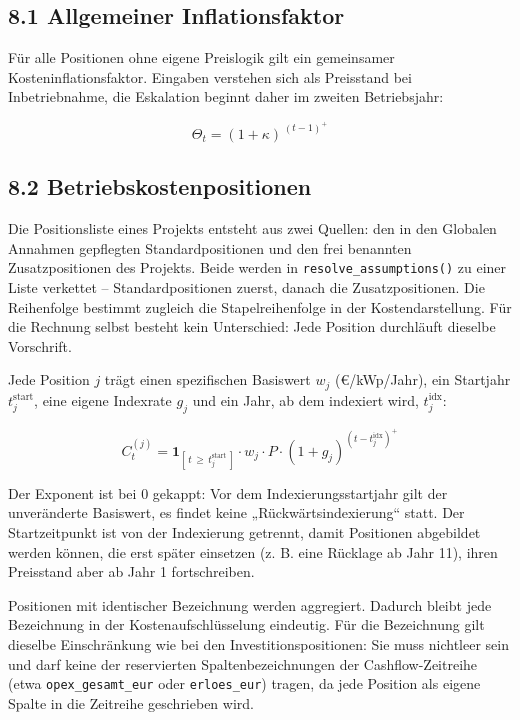 \documentclass[
  a4paper,
  10pt]{article}
\begin{document}
\hypertarget{allgemeiner-inflationsfaktor}{%
\subsection{8.1 Allgemeiner
Inflationsfaktor}\label{allgemeiner-inflationsfaktor}}

Für alle Positionen ohne eigene Preislogik gilt ein gemeinsamer
Kosteninflationsfaktor. Eingaben verstehen sich als Preisstand bei
Inbetriebnahme, die Eskalation beginnt daher im zweiten Betriebsjahr:

\[ \Theta_t = (1 + \kappa)^{\,(t-1)^{+}} \]

\hypertarget{betriebskostenpositionen}{%
\subsection{8.2
Betriebskostenpositionen}\label{betriebskostenpositionen}}

Die Positionsliste eines Projekts entsteht aus zwei Quellen: den in den
Globalen Annahmen gepflegten Standardpositionen und den frei benannten
Zusatzpositionen des Projekts. Beide werden in
\texttt{resolve\_assumptions()} zu einer Liste verkettet --
Standardpositionen zuerst, danach die Zusatzpositionen. Die Reihenfolge
bestimmt zugleich die Stapelreihenfolge in der Kostendarstellung. Für
die Rechnung selbst besteht kein Unterschied: Jede Position durchläuft
dieselbe Vorschrift.

Jede Position \(j\) trägt einen spezifischen Basiswert \(w_j\)
(€/kWp/Jahr), ein Startjahr \(t^{\mathrm{start}}_j\), eine eigene
Indexrate \(g_j\) und ein Jahr, ab dem indexiert wird,
\(t^{\mathrm{idx}}_j\):

\[ C^{(j)}_t = \mathbf{1}_{[\,t\, \geq\, t^{\mathrm{start}}_j\,]} \cdot w_j \cdot P \cdot (1 + g_j)^{\left(t - t^{\mathrm{idx}}_j\right)^{+}} \]

Der Exponent ist bei \(0\) gekappt: Vor dem Indexierungsstartjahr gilt
der unveränderte Basiswert, es findet keine „Rückwärtsindexierung``
statt. Der Startzeitpunkt ist von der Indexierung getrennt, damit
Positionen abgebildet werden können, die erst später einsetzen (z. B.
eine Rücklage ab Jahr 11), ihren Preisstand aber ab Jahr 1
fortschreiben.

Positionen mit identischer Bezeichnung werden aggregiert. Dadurch bleibt
jede Bezeichnung in der Kostenaufschlüsselung eindeutig. Für die
Bezeichnung gilt dieselbe Einschränkung wie bei den
Investitionspositionen: Sie muss nichtleer sein und darf keine der
reservierten Spaltenbezeichnungen der Cashflow-Zeitreihe (etwa
\texttt{opex\_gesamt\_eur} oder \texttt{erloes\_eur}) tragen, da jede
Position als eigene Spalte in die Zeitreihe geschrieben wird.
\end{document}
